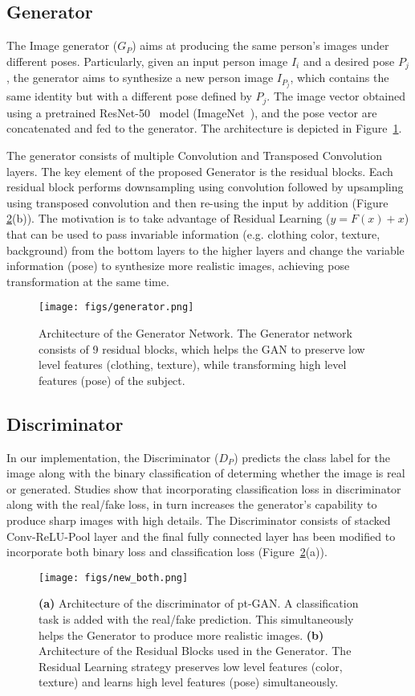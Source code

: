 \documentclass[runningheads]{llncs}
\begin{document}
\subsection{Generator}
The Image generator ($G_P$) aims at producing the same person's images under different poses. Particularly, given an input person image $I_i$ and a desired pose $P_j$, the generator aims to synthesize a new person image $I_{P_j}$, which contains the same identity but with a different pose defined by $P_j$. The image vector obtained using a pretrained ResNet-50~\cite{resnet} model (ImageNet~\cite{imagenet}), and the pose vector are concatenated and fed to the generator. The architecture is depicted in Figure~\ref{fig:generator}.

The generator consists of multiple Convolution and Transposed Convolution layers. The key element of the proposed Generator is the residual blocks. Each residual block performs downsampling using convolution followed by upsampling using transposed convolution and then re-using the input by addition (Figure \ref{fig:both}(b)).
The motivation is to take advantage of Residual Learning ($y = F(x)+x$) that can be used to pass invariable information (e.g. clothing color, texture, background) from the bottom layers to the higher layers and change the variable information (pose) to synthesize more realistic images, achieving pose transformation at the same time.
%
\begin{figure}
	\centering
	\texttt{[image: figs/generator.png]}
	\caption{Architecture of the Generator Network. The Generator network consists of 9 residual blocks, which helps the GAN to preserve low level features (clothing, texture), while transforming high level features (pose) of the subject.}
	\label{fig:generator}
\end{figure}
\vspace{-5mm}
%
\subsection{Discriminator}
In our implementation, the Discriminator ($D_P$) predicts the class label for the image along with the binary classification of determing whether the image is real or generated. Studies \cite{discrim} show that incorporating classification loss in discriminator along with the real/fake loss, in turn increases the generator's capability to produce sharp images with high details. The Discriminator consists of stacked Conv-ReLU-Pool layer and the final fully connected layer has been modified to incorporate both binary loss and classification loss (Figure~\ref{fig:both}(a)).
%
\begin{figure}
	\centering
	\texttt{[image: figs/new\_both.png]}
	\caption{\textbf{(a)} Architecture of the discriminator of pt-GAN. A classification task is added with the real/fake prediction. This simultaneously helps the Generator to produce more realistic images. \textbf{(b)} Architecture of the Residual Blocks used in the Generator. The Residual Learning strategy preserves low level features (color, texture) and learns high level features (pose) simultaneously.}
	\label{fig:both}
\end{figure}
%
\end{document}
